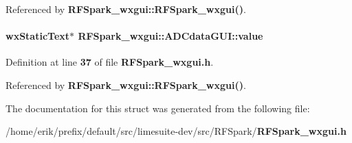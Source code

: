 Referenced by {\bf R\+F\+Spark\+\_\+wxgui\+::\+R\+F\+Spark\+\_\+wxgui()}.

\paragraph[{value}]{\setlength{\rightskip}{0pt plus 5cm}wx\+Static\+Text$\ast$ R\+F\+Spark\+\_\+wxgui\+::\+A\+D\+Cdata\+G\+U\+I\+::value}\label{structRFSpark__wxgui_1_1ADCdataGUI_aec06af667174f314b51770ecb62a2fa4}


Definition at line {\bf 37} of file {\bf R\+F\+Spark\+\_\+wxgui.\+h}.



Referenced by {\bf R\+F\+Spark\+\_\+wxgui\+::\+R\+F\+Spark\+\_\+wxgui()}.



The documentation for this struct was generated from the following file\+:\begin{DoxyCompactItemize}
\item 
/home/erik/prefix/default/src/limesuite-\/dev/src/\+R\+F\+Spark/{\bf R\+F\+Spark\+\_\+wxgui.\+h}\end{DoxyCompactItemize}
